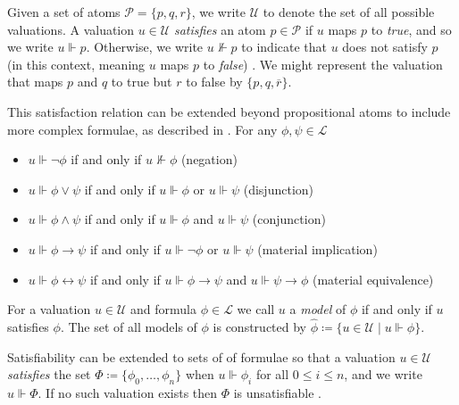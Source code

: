 Given a set of atoms $\mathcal{P} = \{p,q,r\}$, we write $\mathcal{U}$ to denote the set of all possible valuations. A valuation $u \in \mathcal{U}$ \textit{satisfies} an atom $p \in \mathcal{P}$ if $u$ maps $p$ to \textit{true}, and so we write $u \Vdash p$. Otherwise, we write $u \nVdash p$ to indicate that $u$ does not satisfy $p$ (in this context, meaning $u$ maps $p$ to \textit{false}) \cite[p. 16]{Ben1993Mathematical}. We might represent the valuation that maps $p$ and $q$ to true but $r$ to false by $\{p,q,\overline{r}\}$.

This satisfaction relation can be extended beyond propositional atoms to include more complex formulae, as described in . For any $\phi, \psi \in \mathcal{L}$ 

\begin{itemize}
  \item $u \Vdash \neg \phi$ if and only if $u \nVdash \phi$ \hfill (negation)
  \item $u \Vdash \phi \vee \psi$ if and only if $u \Vdash \phi$ or $u \Vdash \psi$ \hfill (disjunction)
  \item $u \Vdash \phi \wedge \psi$ if and only if $u \Vdash \phi$ and $u \Vdash \psi$ \hfill (conjunction)
  \item $u \Vdash \phi \rightarrow \psi$ if and only if $u \Vdash \neg \phi$ or $u \Vdash \psi$ \hfill (material implication)
  \item $u \Vdash \phi \leftrightarrow \psi$ if and only if $u \Vdash \phi \rightarrow \psi$ and $u \Vdash \psi \rightarrow \phi$ \hfill (material equivalence)
\end{itemize}

\begin{definition}
  \label{definition:model}
  For a valuation $u \in \mathcal{U}$ and formula $\phi \in \mathcal{L}$ we call $u$ a \textit{model} of $\phi$ if and only if $u$ satisfies $\phi$. The set of all models of $\phi$ is constructed by $\hat{\phi} \coloneqq \{u \in \mathcal{U} \mid u \Vdash \phi \}$.
\end{definition}

Satisfiability can be extended to sets of of formulae so that a valuation $u \in \mathcal{U}$ \textit{satisfies} the set $\Phi \coloneqq \{\phi_0, \ldots, \phi_n \}$ when $u \Vdash \phi_i$ for all $0 \leq i \leq n$, and we write $u \Vdash \Phi$. If no such valuation exists then $\Phi$ is unsatisfiable \cite[p. 31]{Ben1993Mathematical}.

